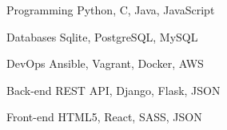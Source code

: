 

\begin{cvskills}

  \cvskill
    {Programming} %
    {Python, C, Java, JavaScript} %

  \cvskill
    {Databases} %
    {Sqlite, PostgreSQL, MySQL} %

  \cvskill
    {DevOps} %
    {Ansible, Vagrant, Docker, AWS} %

  \cvskill
    {Back-end} %
    {REST API, Django, Flask, JSON} %

  \cvskill
    {Front-end} %
    {HTML5, React, SASS, JSON} %


\end{cvskills}

